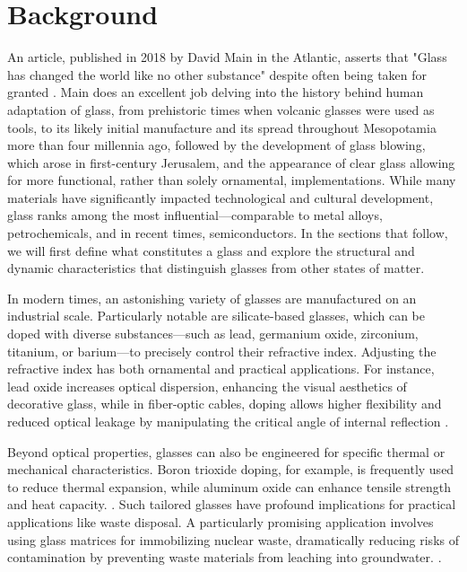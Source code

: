 \chapter{Background} \label{chap:Introduction}

An article, published in 2018 by David Main in the Atlantic, asserts that "Glass has changed the world like no other substance" despite often being taken for granted \nolinebreak \cite{Main}. Main does an excellent job delving into the history behind human adaptation of glass, from prehistoric times when volcanic glasses were used as tools, to its likely initial manufacture and its spread throughout Mesopotamia more than four millennia ago, followed by the development of glass blowing, which arose in first-century Jerusalem, and the appearance of clear glass allowing for more functional, rather than solely ornamental, implementations.  While many materials have significantly impacted technological and cultural development, glass ranks among the most influential—comparable to metal alloys, petrochemicals, and in recent times, semiconductors.  In the sections that follow, we will first define what constitutes a glass and explore the structural and dynamic characteristics that distinguish glasses from other states of matter.

In modern times, an astonishing variety of glasses are manufactured on an industrial scale. Particularly notable are silicate-based glasses, which can be doped with diverse substances—such as lead, germanium oxide, zirconium, titanium, or barium—to precisely control their refractive index. Adjusting the refractive index has both ornamental and practical applications. For instance, lead oxide increases optical dispersion, enhancing the visual aesthetics of decorative glass, while in fiber-optic cables, doping allows higher flexibility and reduced optical leakage by manipulating the critical angle of internal reflection \nolinebreak \cite{Grattan,Jiang}.  

Beyond optical properties, glasses can also be engineered for specific thermal or mechanical characteristics. Boron trioxide doping, for example, is frequently used to reduce thermal expansion, while aluminum oxide can enhance tensile strength and heat capacity. \nolinebreak \cite{Ashby,Askeland}.  Such tailored glasses have profound implications for practical applications like waste disposal. A particularly promising application involves using glass matrices for immobilizing nuclear waste, dramatically reducing risks of contamination by preventing waste materials from leaching into groundwater. \nolinebreak \cite{Plodinec,Ojovan2011}.

